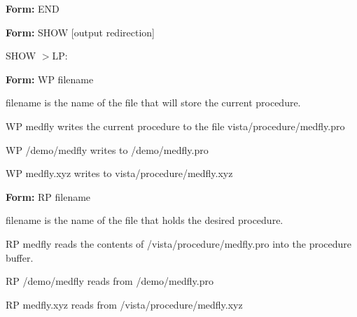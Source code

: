 {\newpage\clearpage
{}%
\begin{command} 
  \item[\textbf{Form: } END\hfill]{}
\end{command}%
\lthtmlfigureZ
\lthtmlcheckvsize\clearpage}

{\newpage\clearpage
{}%
\begin{command}
  \item[\textbf{Form: } SHOW {[output redirection]}\hfill]{}
\end{command}%
\lthtmlfigureZ
\lthtmlcheckvsize\clearpage}

{\newpage\clearpage
{}%
\begin{hanging}
  \item{SHOW $>$LP:}
\end{hanging}%
\lthtmlfigureZ
\lthtmlcheckvsize\clearpage}

{\newpage\clearpage
{}%
\begin{command}
  \item[\textbf{Form: } WP filename\hfill]{}
  \item[filename]{is the name of the file that will store the current procedure.}
\end{command}%
\lthtmlfigureZ
\lthtmlcheckvsize\clearpage}

{\newpage\clearpage
{}%
\begin{example}
  \item[WP medfly\hfill]{writes the current procedure to the file
       vista/procedure/medfly.pro}
  \item[WP /demo/medfly\hfill]{writes to /demo/medfly.pro}
  \item[WP medfly.xyz\hfill]{writes to vista/procedure/medfly.xyz}
\end{example}%
\lthtmlfigureZ
\lthtmlcheckvsize\clearpage}

{\newpage\clearpage
{}%
\begin{command}
  \item[\textbf{Form: } RP filename\hfill]{}
  \item[filename]{is the name of the file that holds the desired procedure.}
\end{command}%
\lthtmlfigureZ
\lthtmlcheckvsize\clearpage}

{\newpage\clearpage
{}%
\begin{example}
  \item[RP medfly\hfill]{reads the contents of /vista/procedure/medfly.pro
       into the procedure buffer.}
  \item[RP /demo/medfly\hfill]{reads from /demo/medfly.pro}
  \item[RP medfly.xyz\hfill]{reads from /vista/procedure/medfly.xyz}
\end{example}%
\lthtmlfigureZ
\lthtmlcheckvsize\clearpage}

